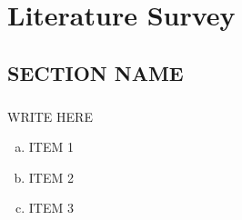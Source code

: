 \chapter{Literature Survey}
\section{SECTION NAME}
\paragraph{}WRITE HERE
\begin{enumerate}[a. ]
 \item ITEM 1
 \item ITEM 2
 \item ITEM 3
\end{enumerate}